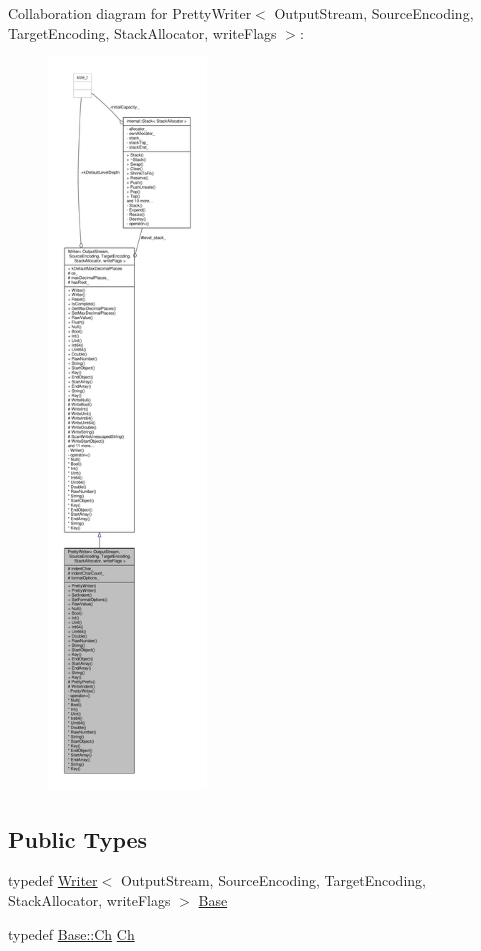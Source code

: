Collaboration diagram for Pretty\+Writer$<$ Output\+Stream, Source\+Encoding, Target\+Encoding, Stack\+Allocator, write\+Flags $>$\+:
\nopagebreak
\begin{figure}[H]
\begin{center}
\leavevmode
\includegraphics[height=550pt]{classPrettyWriter__coll__graph}
\end{center}
\end{figure}
\subsection*{Public Types}
\begin{DoxyCompactItemize}
\item 
typedef \hyperlink{classWriter}{Writer}$<$ Output\+Stream, Source\+Encoding, Target\+Encoding, Stack\+Allocator, write\+Flags $>$ \hyperlink{classPrettyWriter_a6eecc5c896dcdaffca739dcd39d13a17}{Base}
\item 
typedef \hyperlink{classWriter_ab08bff5fd2daec65f4a78779ca3d2139}{Base\+::\+Ch} \hyperlink{classPrettyWriter_ae35c89bda4c5d59d3ff6efcf2fea45a3}{Ch}
\end{DoxyCompactItemize}
